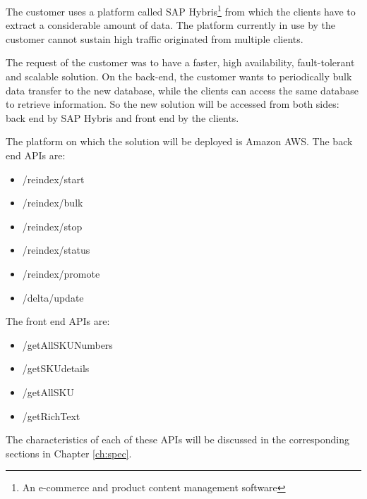 The customer uses a platform called SAP Hybris\footnote{An e-commerce
  and product content management software } from which the clients
have to extract a considerable amount of data.
The platform currently in use by the customer cannot sustain high traffic originated from multiple clients.

The request of the customer was to have a faster, high availability,
fault-tolerant and scalable solution.  
On the back-end, the customer wants to periodically bulk data transfer to the new database, while
the clients can access the same database to retrieve information. 
So the new solution will be accessed from both sides: back end by SAP Hybris and front end by the clients.

The platform on which the solution will be deployed is Amazon AWS.
\label{apigroups}
The back end APIs are:
\begin{itemize}
  \item /reindex/start
  \item /reindex/bulk
  \item /reindex/stop
  \item /reindex/status
  \item /reindex/promote
  \item /delta/update
\end{itemize}

The front end APIs are:
\begin{itemize}
  \item /getAllSKUNumbers
  \item /getSKUdetails
  \item /getAllSKU
  \item /getRichText
\end{itemize}

The characteristics of each of these APIs will be discussed in the
corresponding sections in Chapter \ref{ch:spec}.
 










